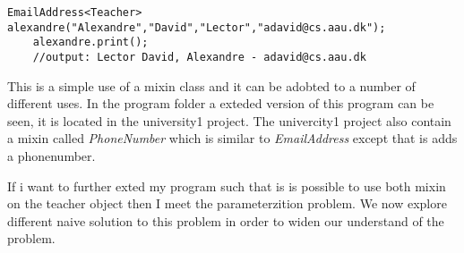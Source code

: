 \begin{lstlisting}[style=cpp, caption=\myCaption{The mixin \textit{EmailAddress} is called on the object teacher. The console output is written as a comment}, label=main1]
	EmailAddress<Teacher> alexandre("Alexandre","David","Lector","adavid@cs.aau.dk");
	alexandre.print();
	//output: Lector David, Alexandre - adavid@cs.aau.dk 	

\end{lstlisting}

This is a simple use of a mixin class and it can be adobted to a number of different uses.
In the program folder a exteded version of this program can be seen, it is located in the university1 project. 
The univercity1 project also contain a mixin called \textit{PhoneNumber} which is similar to \textit{EmailAddress} except that is adds a phonenumber.

If i want to further exted my program such that is is possible to use both mixin on the teacher object then I meet the parameterzition problem.
We now explore different naive solution to this problem in order to widen our understand of the problem.

